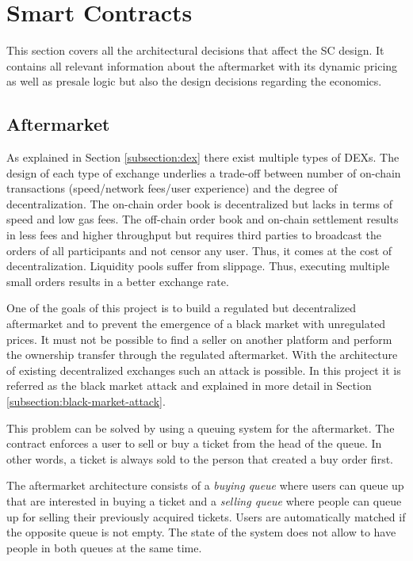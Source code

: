 
\section{Smart Contracts}\label{section:smart-contracts-design}

This section covers all the architectural decisions that affect the SC design. It contains all relevant information about the aftermarket with its dynamic pricing as well as presale logic but also the design decisions regarding the economics.

\subsection{Aftermarket}\label{section:aftermarket}
As explained in Section \ref{subsection:dex} there exist multiple types of DEXs. The design of each type of exchange underlies a trade-off between number of on-chain transactions (speed/network fees/user experience) and the degree of decentralization. The on-chain order book is decentralized but lacks in terms of speed and low gas fees. The off-chain order book and on-chain settlement results in less fees and higher throughput but requires third parties to broadcast the orders of all participants and not censor any user. Thus, it comes at the cost of decentralization. Liquidity pools suffer from slippage. Thus, executing multiple small orders results in a better exchange rate.

One of the goals of this project is to build a regulated but decentralized aftermarket and to prevent the emergence of a black market with unregulated prices. It must not be possible to find a seller on another platform and perform the ownership transfer through the regulated aftermarket. With the architecture of existing decentralized exchanges such an attack is possible. In this project it is referred as the black market attack and explained in more detail in Section \ref{subsection:black-market-attack}. 

This problem can be solved by using a queuing system for the aftermarket. The contract enforces a user to sell or buy a ticket from the head of the queue. In other words, a ticket is always sold to the person that created a buy order first. 

The aftermarket architecture consists of a \textit{buying queue} where users can queue up that are interested in buying a ticket and a \textit{selling queue} where people can queue up for selling their previously acquired tickets. Users are automatically matched if the opposite queue is not empty. The state of the system does not allow to have people in both queues at the same time. 

